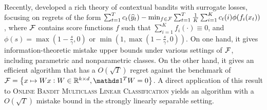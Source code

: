 
Recently, \citet{Foster-Krishnamurthy-2018} developed a rich theory of
contextual bandits with surrogate losses, focusing on regrets of the form
$\sum_{t=1}^T c_t(\widehat{y}_t) - \min_{f \in \mathcal{F}} \sum_{t=1}^T \frac{1}{K}
\sum_{i=1}^K c_t(i) \phi( f_i(x_t) )$, where $\mathcal{F}$ contains score functions
$f$ such that $\sum_{i=1}^K f_i(\cdot) \equiv 0$, and $\phi(s) = \max(1 - \frac
s \gamma, 0)$ or $\min(1, \max(1 - \frac s \gamma, 0))$. On one hand, it gives
information-theoretic mistake upper bounds under various settings of $\mathcal{F}$,
including parametric and nonparametric classes. On the other hand, it gives an
efficient algorithm that has a $O(\sqrt{T})$ regret against the benchmark of
$\calF = \cbr{x \mapsto W x: W \in \R^{k \times d}, \one^T W = 0}$. A direct
application of this result to \textsc{Online Bandit Multiclass Linear
Classification} yields an algorithm with a $O(\sqrt{T})$ mistake bound in the
strongly linearly separable setting.


